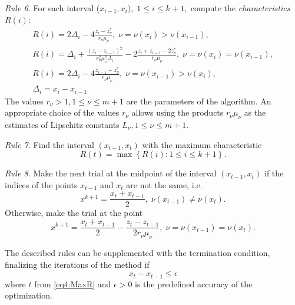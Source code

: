 \emph{Rule 6.} For each interval ($x_{i-1},x_i), \; 1 \leq i \leq k+1,$ compute the \textit{characteristics} $R(i)$:
\begin{gather}
  \label{eq4:characteristic}
  R(i)=2\Delta_i-4\frac{z_i-z_\nu^\ast}{r_\nu \mu_\nu}, \; \nu=\nu(x_i)>\nu(x_{i-1}), \nonumber \\
  R(i)=\Delta_i+\frac{(z_i-z_{i-1})^2}{r_\nu^2 \mu_\nu^2\Delta_i}-2\frac{z_i+z_{i-1}-2z_\nu^\ast}{r_\nu \mu_\nu}, \;  \nu=\nu(x_i)=\nu(x_{i-1}),\\
  R(i)=2\Delta_i-4\frac{z_{i-1}-z_\nu^\ast}{r_\nu \mu_\nu}, \; \nu=\nu(x_{i-1})>\nu(x_i), \nonumber \\
  \Delta_i=x_i - x_{i-1} \nonumber
\end{gather}
The values $r_\nu>1, 1\le\nu\le m+1$ are the parameters of the algorithm. An appropriate choice of the values $r_\nu$ allows using the products $r_\nu\mu_\nu$ as the estimates of Lipschitz constants $L_\nu, 1\le\nu\le m+1$.

\emph{Rule 7.} Find the interval $(x_{t-1},x_t)$ with the maximum characteristic
\begin{equation}
\label{eq4:MaxR}
R(t)=\max{\left\{R(i): 1 \leq i \leq k+1\right\}}.
\end{equation}

\emph{Rule 8.} Make the next trial at the midpoint of the interval
$(x_{t-1},x_t)$ if the indices of the points $x_{t-1}$ and $x_t$  are not the same, i.e.
\[
x^{k+1} = \frac{x_t + x_{t-1}}{2}, \; \nu(x_{t-1}) \neq \nu(x_t).
\]
Otherwise, make the trial at the point
\begin{equation}
\label{eq4:next_point}
x^{k+1} = \frac{x_t+x_{t-1}}{2} - \frac{z_t-z_{t-1}}{2r_\nu\mu_\nu},\; \nu=\nu(x_{t-1})=\nu(x_t).
\end{equation}

The described rules can be supplemented with the termination condition, finalizing the iterations of the method if
\begin{equation}
\label{eq4:stop_cond}
  x_t - x_{t-1}\le\epsilon
\end{equation}
where $t$ from \eqref{eq4:MaxR} and $\epsilon>0$ is the predefined accuracy of the optimization.

